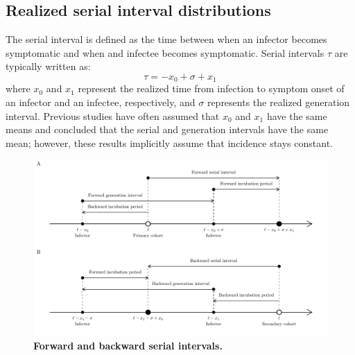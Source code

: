 \documentclass[12pt]{article}
\begin{document}
\subsection{Realized serial interval distributions}

The serial interval is defined as the time between when an infector becomes symptomatic and when and infectee becomes symptomatic.
Serial intervals $\tau$ are typically written as:
\begin{equation}
\tau = - x_0 + \sigma + x_1
\end{equation}
where $x_0$ and $x_1$ represent the realized time from infection to symptom onset of an infector and an infectee, respectively, and $\sigma$ represents the realized generation interval.
Previous studies have often assumed that $x_0$ and $x_1$ have the same means and concluded that the serial and generation intervals have the same mean;
however, these results implicitly assume that incidence stays constant.

\begin{figure}[!th]
\includegraphics[width=\textwidth]{serial_guide.pdf}
\caption{
\textbf{Forward and backward serial intervals.}
}
\label{fig:diagram}
\end{figure}
\end{document}
